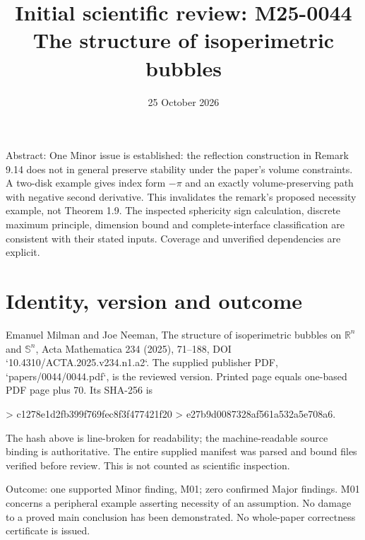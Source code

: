\documentclass[10pt]{article}
\title{Initial scientific review: M25-0044
The structure of isoperimetric bubbles}
\author{}
\date{25 October 2026}
\begin{document}
\maketitle
Abstract: One Minor issue is established: the reflection construction in Remark 9.14 does not in general preserve stability under the paper’s volume constraints. A two-disk example gives index form \(-\pi\) and an exactly volume-preserving path with negative second derivative. This invalidates the remark’s proposed necessity example, not Theorem 1.9. The inspected sphericity sign calculation, discrete maximum principle, dimension bound and complete-interface classification are consistent with their stated inputs. Coverage and unverified dependencies are explicit.\par
\section*{Identity, version and outcome}
Emanuel Milman and Joe Neeman, The structure of isoperimetric bubbles on \(\mathbb R^n\) and \(\mathbb S^n\), Acta Mathematica 234 (2025), 71–188, DOI `10.4310/ACTA.2025.v234.n1.a2`. The supplied publisher PDF, `papers/0044/0044.pdf`, is the reviewed version. Printed page equals one-based PDF page plus 70. Its SHA-256 is\par
> c1278e1d2fb399f769fec8f3f477421f20
> e27b9d0087328af561a532a5e708a6.\par
The hash above is line-broken for readability; the machine-readable source binding is authoritative. The entire supplied manifest was parsed and bound files verified before review. This is not counted as scientific inspection.\par
Outcome: one supported Minor finding, M01; zero confirmed Major findings. M01 concerns a peripheral example asserting necessity of an assumption. No damage to a proved main conclusion has been demonstrated. No whole-paper correctness certificate is issued.\par
\end{document}
